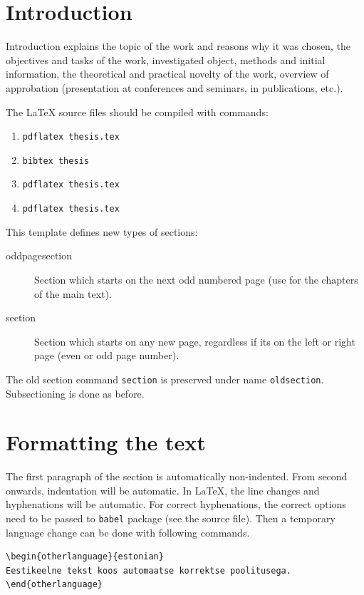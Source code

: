 \section{Introduction}\label{sec:firstSec}

 Introduction explains the topic of the work and reasons why it was chosen, the objectives and tasks of the work, investigated object, methods and initial information, the theoretical and practical novelty of the work, overview of approbation (presentation at conferences and seminars, in publications, etc.).

The LaTeX source files should be compiled with commands:
\begin{enumerate}
\item \texttt{pdflatex thesis.tex}
\item \texttt{bibtex thesis}
\item \texttt{pdflatex thesis.tex}
\item \texttt{pdflatex thesis.tex}
\end{enumerate}

This template defines new types of sections:
\begin{description}
\item[oddpagesection] Section which starts on the next odd numbered page (use for the chapters of the main text).
\item[section] Section which starts on any new page, regardless if its on the left or right page (even or odd page number).
\end{description}
The old section command \texttt{section} is preserved under name \texttt{oldsection}. Subsectioning is done as before.

\section{Formatting the text}\label{sec:secondSec}
The first paragraph of the section is automatically non-indented. From second onwards, indentation will be automatic. In LaTeX, the line changes and hyphenations will be automatic. For correct hyphenations, the correct options need to be passed to \texttt{babel} package (see the source file). Then a temporary language change can be done with following commands.
\begin{verbatim}
\begin{otherlanguage}{estonian}
Eestikeelne tekst koos automaatse korrektse poolitusega. 
\end{otherlanguage}
\end{verbatim}

